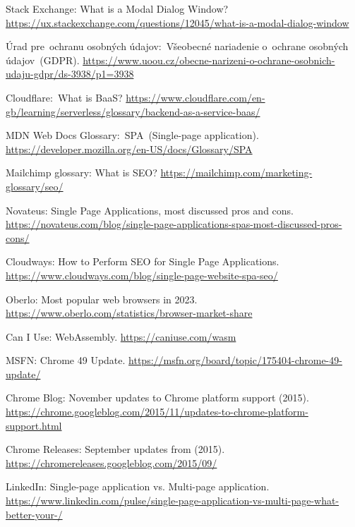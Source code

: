 \begin{thebibliography}{99}


Stack Exchange: What is a Modal Dialog Window?
\url{https://ux.stackexchange.com/questions/12045/what-is-a-modal-dialog-window}

Úrad pre~ochranu osobných údajov:~Všeobecné nariadenie o~ochrane osobných údajov~(GDPR).
\url{https://www.uoou.cz/obecne-narizeni-o-ochrane-osobnich-udaju-gdpr/ds-3938/p1=3938}

Cloudflare:~What is BaaS?
\url{https://www.cloudflare.com/en-gb/learning/serverless/glossary/backend-as-a-service-baas/}

MDN Web Docs Glossary:~SPA~(Single-page application).
\url{https://developer.mozilla.org/en-US/docs/Glossary/SPA}

Mailchimp glossary: What is SEO?
\url{https://mailchimp.com/marketing-glossary/seo/}

Novateus: Single Page Applications, most discussed pros and cons.
\url{https://novateus.com/blog/single-page-applications-spas-most-discussed-pros-cons/}

Cloudways: How to Perform SEO for Single Page Applications.
\url{https://www.cloudways.com/blog/single-page-website-spa-seo/}

Oberlo: Most popular web browsers in 2023.
\url{https://www.oberlo.com/statistics/browser-market-share}

Can I Use: WebAssembly.
\url{https://caniuse.com/wasm}

MSFN: Chrome 49 Update.
\url{https://msfn.org/board/topic/175404-chrome-49-update/}

Chrome Blog: November updates to Chrome platform support (2015).
\url{https://chrome.googleblog.com/2015/11/updates-to-chrome-platform-support.html}

Chrome Releases: September updates from (2015).
\url{https://chromereleases.googleblog.com/2015/09/}

LinkedIn: Single-page application vs. Multi-page application.
\url{https://www.linkedin.com/pulse/single-page-application-vs-multi-page-what-better-your-/}


\end{thebibliography}
